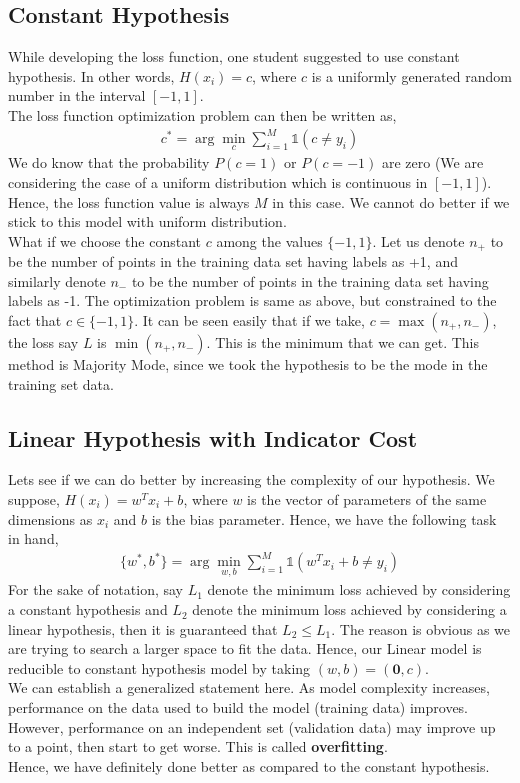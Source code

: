 \documentclass[12pt]{article}
\begin{document}
\subsection{Constant Hypothesis}
While developing the loss function, one student suggested to use constant hypothesis. In other words, $H(x_i) = c$, where $c$ is a uniformly generated random number in the interval $[-1,1]$.\\
The loss function optimization problem can then be written as,
\begin{align*}
    c^{*} = \arg\min_{c} \sum_{i=1}^{M}\mathds{1}(c \ne y_i)
\end{align*}
We do know that the probability $P(c=1)$ or $P(c=-1)$ are zero (We are considering the case of a uniform distribution which is continuous in $[-1,1]$). Hence, the loss function value is always $M$ in this case. We cannot do better if we stick to this model with uniform distribution. \\
What if we choose the constant $c$ among the values $\{-1,1\}$. Let us denote $n_+$ to be the number of points in the training data set having labels as +1, and similarly denote $n_-$ to be the number of points in the training data set having labels as -1. The optimization problem is same as above, but constrained to the fact that $c \in \{-1,1\}$. It can be seen easily that if we take, $c = \max(n_+, n_-)$, the loss say $L$ is $\min(n_+, n_-)$. This is the minimum that we can get. This method is Majority Mode, since we took the hypothesis to be the mode in the training set data.
\subsection{Linear Hypothesis with Indicator Cost}
Lets see if we can do better by increasing the complexity of our hypothesis. We suppose, $H(x_i) = w^Tx_i+b$, where $w$ is the vector of parameters of the same dimensions as $x_i$ and $b$ is the bias parameter. Hence, we have the following task in hand,
\begin{align*}
    \{w^{*}, b^{*}\} = \arg \min_{w,b} \sum_{i=1}^{M} \mathds{1}(w^Tx_i+b \ne y_i)
\end{align*}
For the sake of notation, say $L_1$ denote the minimum loss achieved by considering a constant hypothesis and $L_2$ denote the minimum loss achieved by considering a linear hypothesis, then it is guaranteed that $L_2 \leq L_1$. The reason is obvious as we are trying to search a larger space to fit the data. Hence, our Linear model is reducible to constant hypothesis model by taking $(w, b) = (\mathbf{0}, c)$. \\
We can establish a generalized statement here. As model complexity increases, performance on the data used to build the model (training data) improves. However, performance on an independent set (validation data) may improve up to a point, then start to get worse. This is called \textbf{overfitting}.\\
Hence, we have definitely done better as compared to the constant hypothesis.
\end{document}
